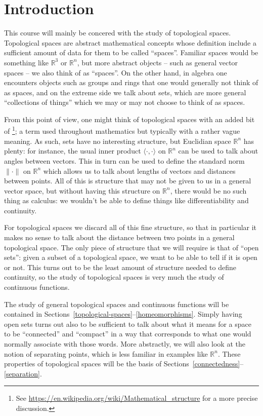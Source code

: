 \section{Introduction}
\label{introduction}
This course will mainly be concered with the study of topological spaces. Topological spaces are abstract mathematical concepts whose definition include a sufficient amount of data for them to be called ``spaces''. Familiar spaces would be something like $\mathbb{R}^3$ or $\mathbb{R}^n$, but more abstract objects -- such as general vector spaces -- we also think of as ``spaces''. On the other hand, in algebra one encounters objects such as groups and rings that one would generally not think of as spaces, and on the extreme side we talk about sets, which are more general ``collections of things'' which we may or may not choose to think of as spaces.

From this point of view, one might think of topological spaces with an added bit of \footnote{See \url{https://en.wikipedia.org/wiki/Mathematical_structure} for a more precise discussion.}; a term used throughout mathematics but typically with a rather vague meaning. As such, sets have no interesting structure, but Euclidian space $\mathbb{R}^n$ has plenty: for instance, the usual inner product $\langle \cdot ,\cdot \rangle$ on $\mathbb{R}^n$ can be used to talk about angles between vectors. This in turn can be used to define the standard norm $\lVert \cdot \rVert$ on $\mathbb{R}^n$ which allows us to talk about lengths of vectors and distances between points. All of this is structure that may not be given to us in a general vector space, but without having this structure on $\mathbb{R}^n$, there would be no such thing as calculus: we wouldn't be able to define things like differentiability and continuity.

For topological spaces we discard all of this fine structure, so that in particular it makes no sense to talk about the distance between two points in a general topological space. The only piece of structure that we will require is that of ``open sets'': given a subset of a topological space, we want to be able to tell if it is open or not. This turns out to be the least amount of structure needed to define continuity, so the study of topological spaces is very much the study of continuous functions.

The study of general topological spaces and continuous functions will be contained in Sections~\ref{topological-spaces}--\ref{homeomorphisms}. Simply having open sets turns out also to be sufficient to talk about what it means for a space to be ``connected'' and ``compact'' in a way that corresponds to what one would normally associate with those words. More abstractly, we will also look at the notion of separating points, which is less familiar in examples like $\mathbb{R}^n$. These properties of topological spaces will be the basis of Sections~\ref{connectedness}--\ref{separation}.

